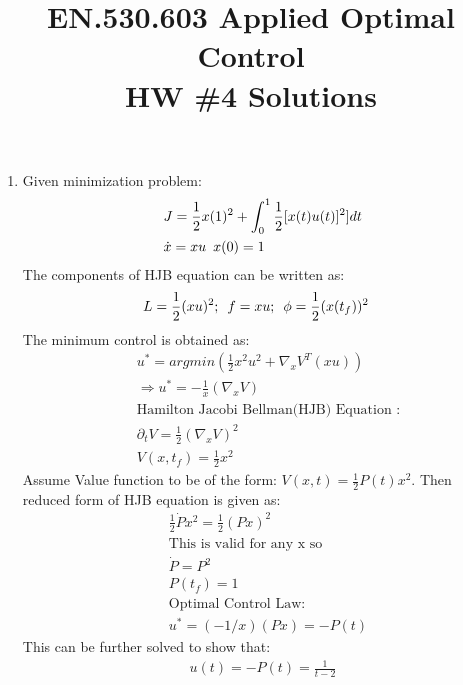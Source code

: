
\title{EN.530.603 Applied Optimal Control \\HW \#4 Solutions}
\graphicspath{{./figures/}}

\maketitle

\begin{enumerate}

  \item  Given minimization problem: 
    \begin{align*}
     &J = \frac{1}{2} x(1)^2 + \int_{0}^{1} \frac{1}{2}[x(t)u(t)]^2] dt\\
     & \dot x = xu \enskip x(0) = 1
    \end{align*}
   The components of HJB equation can be written as:
   \begin{align*}
    &L = \frac{1}{2} (xu)^2; \enskip f = xu; \enskip \phi = \frac{1}{2} (x(t_f))^2
   \end{align*}
   The minimum control is obtained as:
   \begin{align*}
    &u^* = argmin( \frac{1}{2} x^2 u^2 + \nabla_x V^T (xu))\\
    &\Rightarrow u^* = -\frac{1}{x} (\nabla_x V)\\
    &\mbox{Hamilton Jacobi Bellman(HJB) Equation :}\\
    &\partial_t V = \frac{1}{2} (\nabla_x V)^2\\
    & V(x,t_f) = \frac{1}{2}x^2
   \end{align*}
   Assume Value function to be of the form: $V(x,t) = \frac{1}{2} P(t) x^2$. Then reduced form of HJB equation is given as:
   \begin{align*}
    &\frac{1}{2} \dot P x^2  = \frac{1}{2} (Px)^2\\
    &\mbox{This is valid for any x so }\\
    &\dot P = P^2\\
    &P(t_f) = 1\\
    &\mbox{Optimal Control Law: }\\
    &u^* = (-1/x)(Px) = -P(t)
   \end{align*}
   This can be further solved to show that:
   \begin{align*}
    u(t) = -P(t) = \frac{1}{t-2}
   \end{align*}


\end{enumerate}
